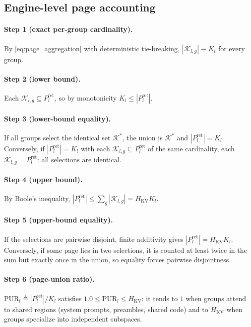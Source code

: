 \documentclass[final,5p,times,twocolumn]{elsarticle}
\theoremstyle{definition}
\theoremstyle{remark}
\newcommand{\HKV}{H_{\mathrm{KV}}}
\newcommand{\RetSet}[2]{\mathcal{K}_{#1,#2}}
\begin{document}
\subsection{Engine-level page accounting}
\label{app:pageaccounting}

\paragraph{Step 1 (exact per-group cardinality).}
By \cref{eq:page_aggregation} with deterministic tie-breaking,
 $|\RetSet{l}{g}| \equiv K_l$ for every group.

\paragraph{Step 2 (lower bound).}
Each $\RetSet{l}{g} \subseteq P^{\mathrm{ret}}_l$, so by monotonicity
 $K_l \le |P^{\mathrm{ret}}_l|$.

\paragraph{Step 3 (lower-bound equality).}
If all groups select the identical set
 $\mathcal{K}^{*}$, the union is $\mathcal{K}^{*}$ and
 $|P^{\mathrm{ret}}_l| = K_l$. Conversely, if
 $|P^{\mathrm{ret}}_l| = K_l$ with each
 $\RetSet{l}{g} \subseteq P^{\mathrm{ret}}_l$ of the same cardinality,
each $\RetSet{l}{g} = P^{\mathrm{ret}}_l$: all selections are
identical.

\paragraph{Step 4 (upper bound).}
By Boole's inequality,
 $|P^{\mathrm{ret}}_l| \le \sum_g |\RetSet{l}{g}| = \HKV K_l$.

\paragraph{Step 5 (upper-bound equality).}
If the selections are pairwise disjoint, finite additivity gives
 $|P^{\mathrm{ret}}_l| = \HKV K_l$. Conversely, if some page lies in
two selections, it is counted at least twice in the sum but exactly
once in the union, so equality forces pairwise disjointness.

\paragraph{Step 6 (page-union ratio).}
 $\mathrm{PUR}_l \triangleq |P^{\mathrm{ret}}_l|/K_l$ satisfies
 $1.0 \le \mathrm{PUR}_l \le \HKV$: it tends to $1$ when groups attend
to shared regions (system prompts, preambles, shared code) and to
 $\HKV$ when groups specialize into independent subspaces.
\end{document}
